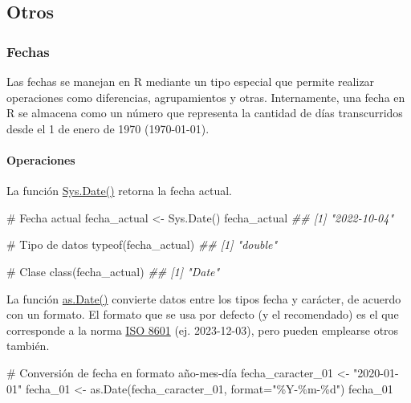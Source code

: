 \documentclass[
  letterpaper,
  DIV=11,
  numbers=noendperiod]{scrreprt}
\let\oldparagraph\paragraph
\renewcommand{\paragraph}[1]{\oldparagraph{#1}\mbox{}}
\newenvironment{Shaded}{\begin{snugshade}}{\end{snugshade}}
\newcommand{\AttributeTok}[1]{\textcolor[rgb]{0.40,0.45,0.13}{#1}}
\newcommand{\CommentTok}[1]{\textcolor[rgb]{0.37,0.37,0.37}{#1}}
\newcommand{\DocumentationTok}[1]{\textcolor[rgb]{0.37,0.37,0.37}{\textit{#1}}}
\newcommand{\FunctionTok}[1]{\textcolor[rgb]{0.28,0.35,0.67}{#1}}
\newcommand{\NormalTok}[1]{\textcolor[rgb]{0.00,0.23,0.31}{#1}}
\newcommand{\OtherTok}[1]{\textcolor[rgb]{0.00,0.23,0.31}{#1}}
\newcommand{\StringTok}[1]{\textcolor[rgb]{0.13,0.47,0.30}{#1}}
\begin{document}
\hypertarget{otros-2}{%
\subsection{Otros}\label{otros-2}}

\hypertarget{fechas}{%
\subsubsection{Fechas}\label{fechas}}

Las fechas se manejan en R mediante un tipo especial que permite
realizar operaciones como diferencias, agrupamientos y otras.
Internamente, una fecha en R se almacena como un número que representa
la cantidad de días transcurridos desde el 1 de enero de 1970
(1970-01-01).

\hypertarget{operaciones-4}{%
\paragraph{Operaciones}\label{operaciones-4}}

La función \href{https://rdrr.io/r/base/Sys.time.html}{Sys.Date()}
retorna la fecha actual.

\begin{Shaded}
\begin{Highlighting}[]
\CommentTok{\# Fecha actual}
\NormalTok{fecha\_actual }\OtherTok{\textless{}{-}} \FunctionTok{Sys.Date}\NormalTok{()}
\NormalTok{fecha\_actual}
\DocumentationTok{\#\# [1] "2022{-}10{-}04"}

\CommentTok{\# Tipo de datos}
\FunctionTok{typeof}\NormalTok{(fecha\_actual)}
\DocumentationTok{\#\# [1] "double"}

\CommentTok{\# Clase}
\FunctionTok{class}\NormalTok{(fecha\_actual)}
\DocumentationTok{\#\# [1] "Date"}
\end{Highlighting}
\end{Shaded}

La función \href{https://rdrr.io/r/base/as.Date.html}{as.Date()}
convierte datos entre los tipos fecha y carácter, de acuerdo con un
formato. El formato que se usa por defecto (y el recomendado) es el que
corresponde a la norma \href{https://es.wikipedia.org/wiki/ISO_8601}{ISO
8601} (ej. 2023-12-03), pero pueden emplearse otros también.

\begin{Shaded}
\begin{Highlighting}[]
\CommentTok{\# Conversión de fecha en formato año{-}mes{-}día}
\NormalTok{fecha\_caracter\_01 }\OtherTok{\textless{}{-}} \StringTok{"2020{-}01{-}01"}
\NormalTok{fecha\_01 }\OtherTok{\textless{}{-}} \FunctionTok{as.Date}\NormalTok{(fecha\_caracter\_01, }\AttributeTok{format=}\StringTok{"\%Y{-}\%m{-}\%d"}\NormalTok{)}
\NormalTok{fecha\_01}
\end{Highlighting}
\end{Shaded}
\end{document}
